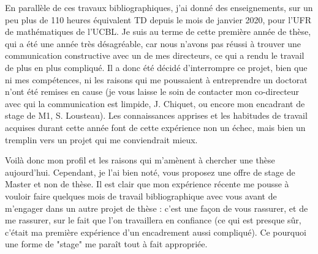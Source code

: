 \documentclass[a4paper,12pt]{article}
\begin{document}
En parallèle de ces travaux bibliographiques, j'ai donné des enseignements, sur un peu plus de 110 heures équivalent TD depuis le mois de janvier 2020, pour l'UFR de mathématiques de l'UCBL. 
Je suis au terme de cette première année de thèse, qui a été une année très désagréable, car nous n'avons pas réussi à trouver une communication constructive avec un de mes directeurs, ce qui a rendu le travail de plus en plus compliqué. Il a donc été décidé d'interrompre ce projet, bien que ni mes compétences, ni les raisons qui me poussaient à entreprendre un doctorat n'ont été remises en cause (je vous laisse le soin de contacter mon co-directeur avec qui la communication est limpide, J. Chiquet, ou encore mon encadrant de stage de M1, S. Lousteau).
Les connaissances apprises et les habitudes de travail acquises durant cette année %
font de cette expérience non un échec, mais bien un tremplin vers un projet qui me conviendrait mieux. 
%
%

Voilà donc mon profil et les raisons qui m'amènent à chercher une thèse aujourd'hui. Cependant, je l'ai bien noté, vous proposez une offre de stage de Master et non de thèse. Il est clair que mon expérience récente me pousse à vouloir faire quelques mois de travail bibliographique avec vous avant de m'engager dans un autre projet de thèse : c'est une façon de vous rassurer, et de me rassurer, sur le fait que l'on travaillera en confiance (ce qui est presque sûr, c'était ma première expérience d'un encadrement aussi compliqué). Ce pourquoi une forme de "stage" me paraît tout à fait appropriée.
\end{document}
